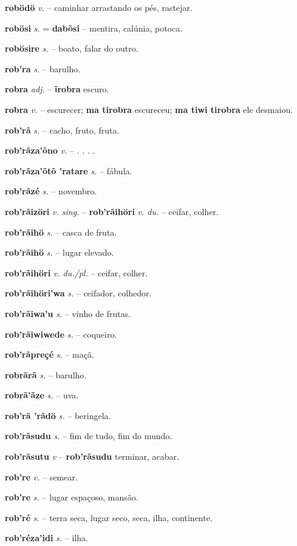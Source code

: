 \textbf{robödö} \textit{v.} -- caminhar arrastando os pés, rastejar.

\textbf{robösi} \textit{s.} = \textbf{dabõsi} -- mentira, calúnia, potoca.

\textbf{robösire} \textit{s.} -- boato, falar do outro.

\textbf{rob'ra} \textit{s.} -- barulho.

\textbf{robra} \textit{adj.} -- \textbf{ĩrobra} escuro.

\textbf{robra} \textit{v.} -- escurecer; \textbf{ma tirobra} escureceu; \textbf{ma tiwi tirobra} ele desmaiou.

\textbf{rob'rã} \textit{s.} -- cacho, fruto, fruta.

\textbf{rob'rãza'õno} \textit{v.} -- . . . .

\textbf{rob'rãza'õtõ 'ratare} \textit{s.} -- fábula.

\textbf{rob'rãzé} \textit{s.} -- novembro.

\textbf{rob'rãizöri} \textit{v. sing.} -- \textbf{rob'rãihöri} \textit{v. du.} -- ceifar, colher.

\textbf{rob'rãihö} \textit{s.} -- casca de fruta.

\textbf{rob'rãihö} \textit{s.} -- lugar elevado.

\textbf{rob'rãihöri} \textit{v. du./pl.} -- ceifar, colher.

\textbf{rob'rãihöri'wa} \textit{s.} -- ceifador, colhedor.

\textbf{rob'rãiwa'u} \textit{s.} -- vinho de frutas.

\textbf{rob'rãiwiwede} \textit{s.} -- coqueiro.

\textbf{rob'rãpreçé} \textit{s.} -- maçã.

\textbf{robrãrã} \textit{s.} -- barulho.

\textbf{robrã'ãze} \textit{s.} -- uva.

\textbf{rob'rã 'rãdö} \textit{s.} -- beringela.

\textbf{rob'rãsudu} \textit{s.} -- fim de tudo, fim do mundo.

\textbf{rob'rãsutu} \textit{v} -- \textbf{rob'rãsudu} terminar, acabar.

\textbf{rob're} \textit{v.} -- semear.

\textbf{rob're} \textit{s.} -- lugar espaçoso, mansão.

\textbf{rob'ré} \textit{s.} -- terra seca, lugar seco, seca, ilha, continente.

\textbf{rob'réza'idi} \textit{s.} -- ilha.

